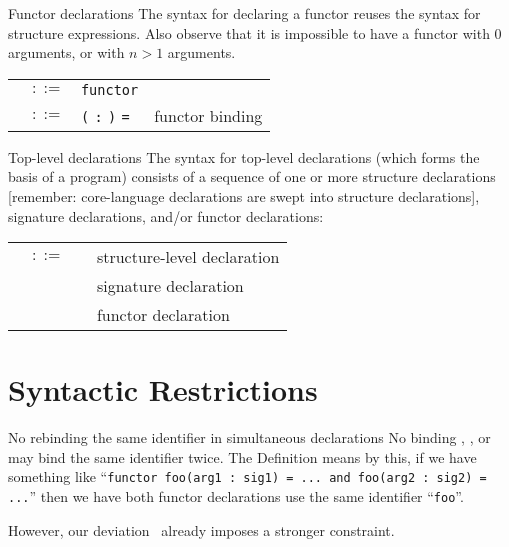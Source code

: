 \begin{grammar}{Functor declarations}
The syntax for declaring a functor reuses the syntax for structure
expressions. Also observe that it is impossible to have a functor with
$0$ arguments, or with $n>1$ arguments.
\begin{longtable}{rcll}
\label{grammar:fundec}\nonterminal{fund} & $::=$ & \texttt{functor} \nonterminal{funbind} & \\
\label{grammar:funbind}\nonterminal{funbind} & $::=$ &
\nonterminal{funid} \texttt{(}\nonterminal{strid} \texttt{:} \nonterminal{sigexp}\texttt{)} \texttt{=} \hyperref[grammar:strexp]{\nonterminal{strexp}}
\optional{\texttt{and} \nonterminal{funbind}}
& functor binding\\
\end{longtable}
\end{grammar}

\begin{grammar}{Top-level declarations}
The syntax for top-level declarations (which forms the basis of a
program) consists of a sequence of one or more structure declarations
[remember: core-language declarations are swept into structure declarations],
signature declarations, and/or functor declarations:
\begin{longtable}{rcll}
  \label{grammar:topdec}\nonterminal{topdec} & $::=$ &
\hyperref[grammar:strdec]{\nonterminal{strdec}} \optional{\nonterminal{topdec}} & structure-level declaration \\
&\alt& \hyperref[grammar:sigdec]{\nonterminal{sigdec}} \optional{\nonterminal{topdec}} & signature declaration \\
&\alt& \hyperref[grammar:fundec]{\nonterminal{fundec}} \optional{\nonterminal{topdec}} & functor declaration \\
\end{longtable}
\end{grammar}

\section{Syntactic Restrictions}

\begin{clause}{No rebinding the same identifier in simultaneous declarations}
No binding , , or
 may bind the same identifier twice.
The Definition means by this, if we have something like 
``\texttt{functor foo(arg1 : sig1) = ... and foo(arg2 : sig2) = ...}''
then we have both functor declarations use the same identifier
``\texttt{foo}''.

However, our deviation~ already imposes
a stronger constraint.
\end{clause}

